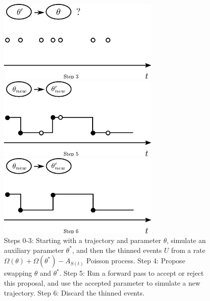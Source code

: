 \begin{figure}[H]
\begin{minipage}[hp]{0.45\linewidth}
  \centering
    \includegraphics [width=0.70\textwidth, angle=0]{figs/plot3.pdf}
    \vspace{-0 in}
  \end{minipage}
  \begin{minipage}[hp]{0.45\linewidth}
  \centering
    \includegraphics [width=0.70\textwidth, angle=0]{figs/plot5.pdf}
    \vspace{-0 in}
  \end{minipage}
  \begin{minipage}[hp]{0.45\linewidth}
  \centering
    \includegraphics [width=0.70\textwidth, angle=0]{figs/plot6.pdf}
    \vspace{-0 in}
  \end{minipage}
    \caption{Steps 0-3: Starting with a trajectory and parameter $\theta$,
      simulate an auxiliary parameter $\theta^*$, and then the thinned events
      $U$ from a rate $\Omega(\theta) + \Omega(\theta^*) - A_{S(t)}$ Poisson
      process. Step 4: Propose swapping $\theta$ and $\theta^*$. Step 5:
      Run a forward pass to accept or reject this proposal, and use the accepted
    parameter to simulate a new trajectory. Step 6: Discard the thinned events.} 
   \label{fig:MH_improved}

  \end{figure}


